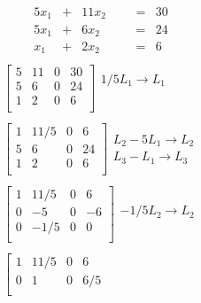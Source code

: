 \documentclass[]{article}
\begin{document}
\[
\begin{array}{rrrrrrr}
5 x_{1} & + & 11 x_{2} & & & = & 30 \\ 
5 x_{1} & + & 6 x_{2} & & & = & 24 \\ 
x_{1} & + & 2 x_{2} & & & = & 6 \\ 
\end{array}
\]\[
\begin{array}{l}
\left[
\begin{array}{rrr|r}
5 & 11 & 0 & 30 \\ 
5 & 6 & 0 & 24 \\ 
1 & 2 & 0 & 6 \\ 
\end{array}
\right]\begin{array}{l}
1/5 L_{1} \rightarrow L_{1}\\ 
\\ 
\\ 
\end{array}\\
 \\
\left[
\begin{array}{rrr|r}
1 & 11/5 & 0 & 6 \\ 
5 & 6 & 0 & 24 \\ 
1 & 2 & 0 & 6 \\ 
\end{array}
\right]\begin{array}{l}
\\ 
 L_{2} - 5 L_{1} \rightarrow L_{2} \\ 
 L_{3} -  L_{1} \rightarrow L_{3} \\ 
\end{array}\\
 \\
\left[
\begin{array}{rrr|r}
1 & 11/5 & 0 & 6 \\ 
0 & -5 & 0 & -6 \\ 
0 & -1/5 & 0 & 0 \\ 
\end{array}
\right]\begin{array}{l}
\\ 
-1/5 L_{2} \rightarrow L_{2}\\ 
\\ 
\end{array}\\
 \\
\left[
\begin{array}{rrr|r}
1 & 11/5 & 0 & 6 \\ 
0 & 1 & 0 & 6/5 \\ 

\end{array}
\end{array}\]
\end{document}
